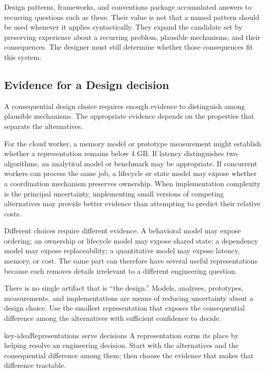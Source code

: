 Design patterns, frameworks, and conventions package accumulated answers to recurring questions such as these.
Their value is not that a named pattern should be used whenever it applies syntactically.
They expand the candidate set by preserving experience about a recurring problem, plausible mechanisms, and their consequences.
The designer must still determine whether those consequences fit this system.

\subsection{Evidence for a Design decision}\label{evidence-for-a-design-decision}

A consequential design choice requires enough evidence to distinguish among plausible mechanisms.
The appropriate evidence depends on the properties that separate the alternatives.

For the cloud worker, a memory model or prototype measurement might establish whether a representation remains below 4 GB.
If latency distinguishes two algorithms, an analytical model or benchmark may be appropriate.
If concurrent workers can process the same job, a lifecycle or state model may expose whether a coordination mechanism preserves ownership.
When implementation complexity is the principal uncertainty, implementing small versions of competing alternatives may provide better evidence than attempting to predict their relative costs.

Different choices require different evidence.
A behavioral model may expose ordering; an ownership or lifecycle model may expose shared state; a dependency model may expose replaceability; a quantitative model may expose latency, memory, or cost.
The same part can therefore have several useful representations because each removes details irrelevant to a different engineering question.

There is no single artifact that is ``the design.''
Models, analyses, prototypes, measurements, and implementations are means of reducing uncertainty about a design choice.
Use the smallest representation that exposes the consequential difference among the alternatives with sufficient confidence to decide.

\begin{bookbox}{key-idea}{Representations serve decisions} %
A representation earns its place by helping resolve an engineering decision. Start with the
alternatives and the consequential difference among them; then choose the evidence that makes that
difference tractable.
\end{bookbox}

